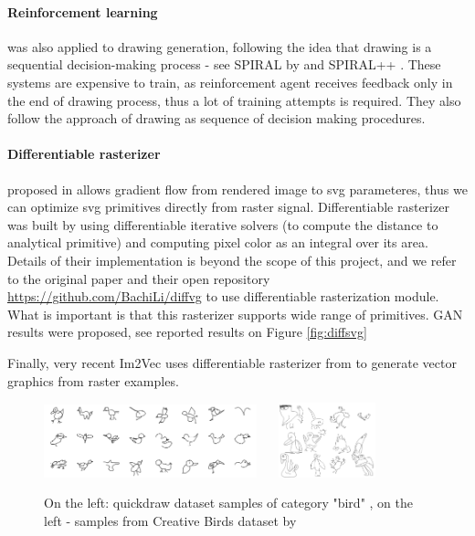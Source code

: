 \documentclass{article}
\begin{document}
	\paragraph{Reinforcement learning} was also applied to drawing generation, following the idea that drawing is a sequential decision-making process - see SPIRAL by \cite{ganin2018synthesizing} and SPIRAL++ \cite{mellor2019unsupervised}. These systems are expensive to train, as reinforcement agent receives feedback only in the end of drawing process, thus a lot of training attempts is required. They also follow the approach of drawing as sequence of decision making procedures.
	
	\paragraph{Differentiable rasterizer} proposed in \cite{diffsvg} allows gradient flow from rendered image to svg parameteres, thus we can optimize svg primitives directly from raster signal. Differentiable rasterizer was built by using differentiable iterative solvers (to compute the distance to analytical primitive) and computing pixel color as an integral over its area. Details of their implementation is beyond the scope of this project, and we refer to the original paper and their open repository \url{https://github.com/BachiLi/diffvg} to use differentiable rasterization module. What is important is that this rasterizer supports wide range of primitives. GAN results were proposed, see reported  results on Figure \ref{fig:diffsvg}
	
	Finally, very recent Im2Vec \cite{reddy2021im2vec} uses differentiable rasterizer from \cite{diffsvg} to generate vector graphics from raster examples.
	
	\begin{figure}[h]
		\centering
		\includegraphics[width=0.55\textwidth]{img/quickdraw.png}
		\hspace{4mm}
		\unskip\ \vrule\
		\hspace{4mm}
		\includegraphics[width=0.25\textwidth]{img/data_birds.png}
		\caption{On the left: quickdraw dataset samples of category "bird" , on the left - samples from Creative Birds dataset by \cite{doodlergan}}
		\label{fig:doodlergan}
	\end{figure}
\end{document}
